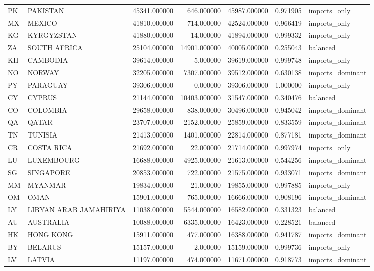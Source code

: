 \begin{tabular}{llrrrrl}
PK & PAKISTAN & 45341.000000 & 646.000000 & 45987.000000 & 0.971905 & imports\_only \\
MX & MEXICO & 41810.000000 & 714.000000 & 42524.000000 & 0.966419 & imports\_only \\
KG & KYRGYZSTAN & 41880.000000 & 14.000000 & 41894.000000 & 0.999332 & imports\_only \\
ZA & SOUTH AFRICA & 25104.000000 & 14901.000000 & 40005.000000 & 0.255043 & balanced \\
KH & CAMBODIA & 39614.000000 & 5.000000 & 39619.000000 & 0.999748 & imports\_only \\
NO & NORWAY & 32205.000000 & 7307.000000 & 39512.000000 & 0.630138 & imports\_dominant \\
PY & PARAGUAY & 39306.000000 & 0.000000 & 39306.000000 & 1.000000 & imports\_only \\
CY & CYPRUS & 21144.000000 & 10403.000000 & 31547.000000 & 0.340476 & balanced \\
CO & COLOMBIA & 29658.000000 & 838.000000 & 30496.000000 & 0.945042 & imports\_dominant \\
QA & QATAR & 23707.000000 & 2152.000000 & 25859.000000 & 0.833559 & imports\_dominant \\
TN & TUNISIA & 21413.000000 & 1401.000000 & 22814.000000 & 0.877181 & imports\_dominant \\
CR & COSTA RICA & 21692.000000 & 22.000000 & 21714.000000 & 0.997974 & imports\_only \\
LU & LUXEMBOURG & 16688.000000 & 4925.000000 & 21613.000000 & 0.544256 & imports\_dominant \\
SG & SINGAPORE & 20853.000000 & 722.000000 & 21575.000000 & 0.933071 & imports\_dominant \\
MM & MYANMAR & 19834.000000 & 21.000000 & 19855.000000 & 0.997885 & imports\_only \\
OM & OMAN & 15901.000000 & 765.000000 & 16666.000000 & 0.908196 & imports\_dominant \\
LY & LIBYAN ARAB JAMAHIRIYA & 11038.000000 & 5544.000000 & 16582.000000 & 0.331323 & balanced \\
AU & AUSTRALIA & 10088.000000 & 6335.000000 & 16423.000000 & 0.228521 & balanced \\
HK & HONG KONG & 15911.000000 & 477.000000 & 16388.000000 & 0.941787 & imports\_dominant \\
BY & BELARUS & 15157.000000 & 2.000000 & 15159.000000 & 0.999736 & imports\_only \\
LV & LATVIA & 11197.000000 & 474.000000 & 11671.000000 & 0.918773 & imports\_dominant \\

\end{tabular}
